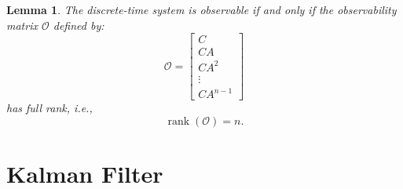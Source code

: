 \documentclass[a4 paper]{article}
\numberwithin{equation}{section}
\theoremstyle{boldStyle}
\theoremstyle{boldBlueStyle}
\newtheorem{lemma}{Lemma}[section]
\theoremstyle{boldPurpleStyle}
\theoremstyle{boldRedStyle}
\theoremstyle{boldGreenStyle}
\begin{document}
  \begin{lemma}
  The discrete-time system is observable if and only if the observability matrix \( \mathcal{O} \) defined by:
  \[
  \mathcal{O} = \begin{bmatrix}
  C \\
  CA \\
  CA^2 \\
  \vdots \\
  CA^{n-1}
  \end{bmatrix}
  \]
  has full rank, i.e.,
  \[
  \operatorname{rank}(\mathcal{O}) = n.
  \]
  \end{lemma}






















\newpage
\section{Kalman Filter}
\end{document}
